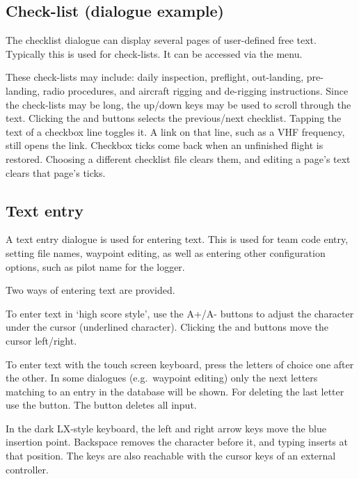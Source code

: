 \subsection*{Check-list (dialogue example)}\label{sec:checklist}

The checklist dialogue can display several pages of user-defined free text.
Typically this is used for check-lists. It can be accessed via the menu.

\blink{}

These check-lists may include: daily inspection, preflight,
out-landing, pre-landing, radio procedures, and aircraft rigging and
de-rigging instructions.  Since the check-lists may be long, the
up/down keys may be used to scroll through the text. Clicking the
\bmenuw{$<$} and \bmenuw{$>$} buttons selects the previous/next
checklist.  Tapping the text of a checkbox line toggles it.  A link
on that line, such as a VHF frequency, still opens the link.
Checkbox ticks come back when an unfinished flight is restored.
Choosing a different checklist file clears them, and editing a
page's text clears that page's ticks.


\subsection*{Text entry} \label{sec:textentry}

A text entry dialogue is used for entering text.  This is used for team
code entry, setting file names, waypoint editing, as well as entering
other configuration options, such as pilot name for the logger.

Two ways of entering text are provided. 

To enter text in `high score style', use the A+/A- buttons to adjust the 
character under the cursor (underlined character). Clicking the \button{$<$} 
and \button{$>$} buttons move the cursor left/right.  

To enter text with the touch screen keyboard, press the letters of choice 
one after the other. In some dialogues (e.g.\ waypoint editing) only the next
letters matching to an entry in the database will be shown. For deleting the 
last letter use the \button{$<-$} button. The  button deletes all input.

In the dark LX-style keyboard, the left and right arrow keys move the
blue insertion point.  Backspace removes the character before it, and
typing inserts at that position.  The keys are also reachable with the
cursor keys of an external controller.

